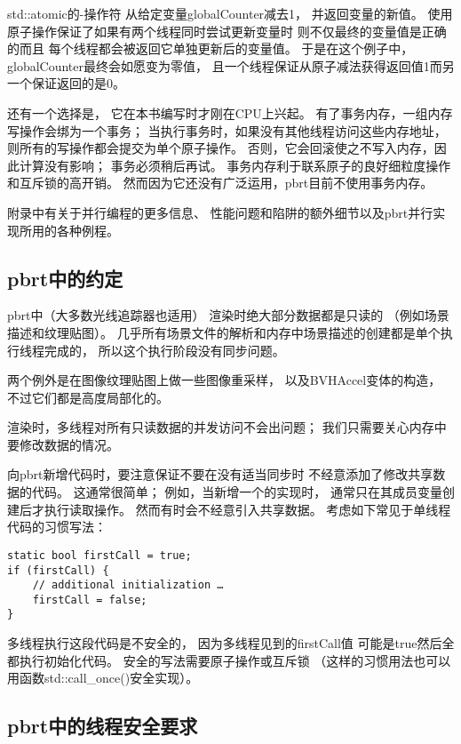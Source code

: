 {\ttfamily std::atomic}的{\ttfamily -}操作符
从给定变量{\ttfamily globalCounter}减去1，
并返回变量的新值。
使用原子操作保证了如果有两个线程同时尝试更新变量时
则不仅最终的变量值是正确的而且
每个线程都会被返回它单独更新后的变量值。
于是在这个例子中，{\ttfamily globalCounter}最终会如愿变为零值，
且一个线程保证从原子减法获得返回值1而另一个保证返回的是0。

还有一个选择是，
它在本书编写时才刚在CPU上兴起。
有了事务内存，一组内存写操作会绑为一个事务；
当执行事务时，如果没有其他线程访问这些内存地址，
则所有的写操作都会提交为单个原子操作。
否则，它会回滚使之不写入内存，因此计算没有影响；
事务必须稍后再试。
事务内存利于联系原子的良好细粒度操作和互斥锁的高开销。
然而因为它还没有广泛运用，pbrt目前不使用事务内存。

附录中有关于并行编程的更多信息、
性能问题和陷阱的额外细节以及pbrt并行实现所用的各种例程。

\subsection{pbrt中的约定}\label{sub:pbrt中的约定}
pbrt中（大多数光线追踪器也适用）
渲染时绝大部分数据都是只读的
（例如场景描述和纹理贴图）。
几乎所有场景文件的解析和内存中场景描述的创建都是单个执行线程完成的，
所以这个执行阶段没有同步问题。
\begin{remark}
    两个例外是在图像纹理贴图上做一些图像重采样，
    以及{\ttfamily BVHAccel}变体的构造，
    不过它们都是高度局部化的。
\end{remark}
渲染时，多线程对所有只读数据的并发访问不会出问题；
我们只需要关心内存中要修改数据的情况。

向pbrt新增代码时，要注意保证不要在没有适当同步时
不经意添加了修改共享数据的代码。
这通常很简单；
例如，当新增一个的实现时，
通常只在其成员变量创建后才执行读取操作。
然而有时会不经意引入共享数据。
考虑如下常见于单线程代码的习惯写法：
\begin{lstlisting}
static bool firstCall = true;
if (firstCall) {
    // additional initialization …
    firstCall = false;
}
\end{lstlisting}

多线程执行这段代码是不安全的，
因为多线程见到的{\ttfamily firstCall}值
可能是{\ttfamily true}然后全都执行初始化代码。
安全的写法需要原子操作或互斥锁
（这样的习惯用法也可以用函数{\ttfamily std::call\_once()}安全实现）。

\subsection{pbrt中的线程安全要求}

